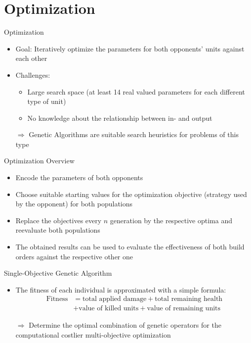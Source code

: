 \documentclass{beamer}
\begin{document}
\section{Optimization}
\begin{frame}{Optimization}
\begin{itemize}
\item \alert{Goal:} Iteratively optimize the parameters for both opponents' units against each other
\item \alert{Challenges:} 
\begin{itemize}
\item Large search space (at least 14 real valued parameters for each different type of unit) 
\item No knowledge about the relationship between in- and output
\end{itemize}
\item[$\Rightarrow$] \alert{Genetic Algorithms} are suitable search heuristics for problems of this type
\end{itemize}
\end{frame}

\begin{frame}{Optimization}
\alert{Overview}
\begin{itemize}
\item Encode the parameters of both opponents
\item Choose suitable starting values for the optimization objective (strategy used by the opponent) for both populations
\item Replace the objectives every $n$ generation by the respective optima and reevaluate both populations
\item The obtained results can be used to evaluate the effectiveness of both build orders against the respective other one
\end{itemize}
\end{frame}

\begin{frame}{Single-Objective Genetic Algorithm}

\begin{itemize}
\item The fitness of each individual is approximated with a simple formula:  \\
\begin{equation*}
\begin{split}
\text{Fitness} & = \text{total applied damage} + \text{total remaining health} 
\\ & + \text{value of killed units} + \text{value of remaining units} 
\end{split}
\end{equation*}
\item[$\Rightarrow$] Determine the \alert{optimal combination of genetic operators} for the computational costlier multi-objective optimization
\end{itemize}
\end{frame}
\end{document}

